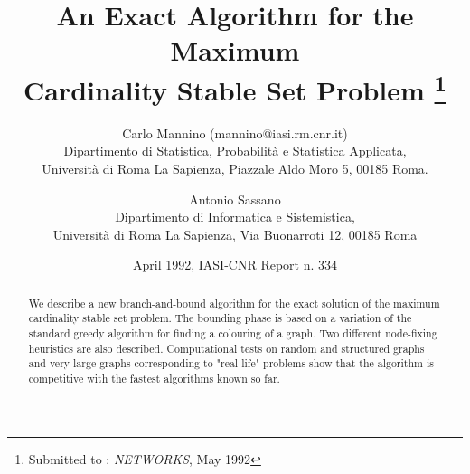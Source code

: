 

 

\def\square{{\setbox0=\hbox{X}\hbox to \ht0{\vrule\hss\vbox to \ht0{
    \hrule width \ht0\vfil\hrule width \ht0}\vrule}}}

\newtheorem{theorem}{Theorem}
\newtheorem{lemma}{Lemma}
\newtheorem{fact}{Fact}
\newtheorem{proposition}{Proposition}
\newtheorem{property}{Property}
\newtheorem{corollary}{Corollary}
\newenvironment{proof}
{{\bf Proof:}}{\hspace*{\fill}$\square$\par\vspace{2mm}}
\newcommand{\sketch}{\par\addvspace\topsep\noindent{\bf
Sketch~of~Proof\/}: \ignorespaces }
\newcommand{\qed}{~$\square$\ifmmode\else\par\addvspace\topsep\fi} 


\title{\bf An Exact Algorithm for the Maximum \\
Cardinality  Stable Set Problem
\footnote{Submitted to : {\em NETWORKS}, May 1992}}

\author{Carlo Mannino (mannino@iasi.rm.cnr.it)\\ 
Dipartimento di Statistica, Probabilit\`a e
Statistica Applicata,\\
 Universit\`a di Roma La Sapienza, Piazzale
Aldo Moro 5, 00185 Roma. \and 
 Antonio Sassano \\ 
Dipartimento di Informatica e
Sistemistica, \\
Universit\`a di Roma La Sapienza, Via Buonarroti 12,
00185 Roma
}
\date{April 1992, IASI-CNR Report n. 334}
\maketitle 
\begin{abstract}  
\vspace{1cm} 
\noindent  
We describe a new branch-and-bound algorithm for the exact solution of the
maximum cardinality stable set problem. The bounding
phase is based on a variation of the standard greedy
algorithm for finding a colouring of a graph. Two different
node-fixing heuristics are also
described. Computational tests on random and structured graphs and
very large graphs corresponding to  "real-life" problems show that
the algorithm is competitive with the fastest algorithms known so
far. 
\end{abstract}  

